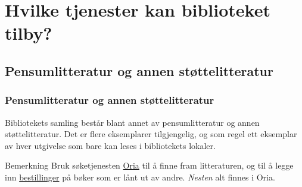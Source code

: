 \documentclass{beamer}
\begin{document}
\section{Hvilke tjenester kan biblioteket tilby?}
\subsection{Pensumlitteratur og annen støttelitteratur}
\begin{frame}
  \frametitle{Pensumlitteratur og annen støttelitteratur}
  Bibliotekets samling består blant annet av \alert{pensumlitteratur} og annen \alert{støttelitteratur}. Det er flere eksemplarer tilgjengelig, og som regel ett eksemplar av hver utgivelse som bare kan leses i bibliotekets lokaler.

  \vfill

  \begin{block}{Bemerkning}
    Bruk søketjenesten \href{http://bibsys-almaprimo.hosted.exlibrisgroup.com/primo_library/libweb/action/search.do?vid=DMMH}{Oria} til å finne fram litteraturen, og til å legge inn \href{https://dmmh.no/bibliotek/bestillinger}{bestillinger} på bøker som er lånt ut av andre. \textit{Nesten} alt finnes i Oria.
  \end{block}
\end{frame}
\end{document}
